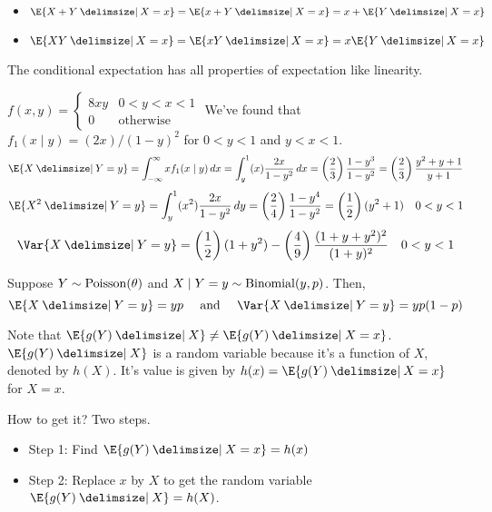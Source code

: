 \begin{Example}{}{}
    \begin{itemize}
        \item $ \E{X+Y\given X=x}=\E{x+Y\given X=x}=x+\E{Y\given X=x} $
        \item $ \E{XY\given X=x}=\E{xY\given X=x}=x\E{Y\given X=x} $
    \end{itemize}
\end{Example}
\begin{Theorem}{}{}
    The conditional expectation has all properties of expectation like
    linearity.
\end{Theorem}
\begin{Example}{}{}
    $ \displaystyle f(x,y)=\begin{cases}
            8 x y & 0<y<x<1          \\
            0     & \text{otherwise}
        \end{cases} $
    We've found that $ f_1(x\mid y)=(2x)/(1-y)^2 $ for $ 0<y<1 $ and $ y<x<1 $.
    \[ \E{X\given Y=y}=\int_{-\infty}^{\infty} x f_1(x\mid y)\, d{x}=
        \int_{y}^{1} (x) \frac{2x}{1-y^2}\, d{x}=\left( \frac{2}{3} \right)
        \frac{1-y^3}{1-y^2}=\left( \frac{2}{3}  \right)
        \frac{y^2+y+1}{y+1}   \]
    \[ \E{X^2\given Y=y}=\int_{y}^{1} (x^2)
        \frac{2x}{1-y^2} \, d{y}=\left( \frac{2}{4} \right)
        \frac{1-y^4}{1-y^2}=\left( \frac{1}{2}  \right)(y^2+1)\quad 0<y<1 \]
    \[ \Var{X\given Y=y}=\left( \frac{1}{2} \right) (1+y^2)-
        \left( \frac{4}{9}  \right)\frac{(1+y+y^2)^2}{(1+y)^2}\quad 0<y<1  \]
\end{Example}
\begin{Example}{}{}
    Suppose $ Y \sim \operatorname{Poisson}(\theta) $ and $ X\mid Y=y \sim \operatorname{Binomial}(y,p) $. Then,
    \[ \E{X\given Y=y}=yp\quad\text{ and }\quad\Var{X\given Y=y}=yp(1-p) \]
\end{Example}
\begin{Remark}{}{}
    Note that $ \E{g(Y)\given X}\neq \E{g(Y)\given X=x} $.
    $ \E{g(Y)\given X} $ is a random variable because it's a function
    of $ X $, denoted by $ h(X) $. It's value is given by $ h(x)=
        \E{g(Y)\given X=x} $ for $ X=x $.

    How to get it? Two steps.
    \begin{itemize}
        \item Step 1: Find $ \E{g(Y)\given X=x}=h(x) $
        \item Step 2: Replace $ x $ by $ X $ to get the random variable $ \E{g(Y)\given X}=h(X) $.
    \end{itemize}
\end{Remark}
